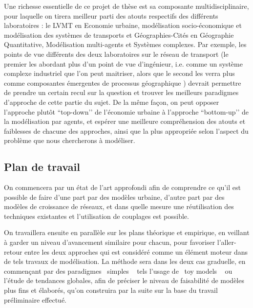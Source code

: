 \documentclass[french,12pt]{article}
\makeatletter
\providecommand{\og}{\leavevmode\flqq~}%
\providecommand{\fg}{\ifdim\lastskip>\z@\unskip\fi~\frqq}%
\makeatother
\begin{document}
Une richesse essentielle de ce projet de thèse est sa composante multidisciplinaire, pour laquelle on tirera meilleur parti des atouts respectifs des différents laboratoires : le LVMT en Economie urbaine, modélisation socio-économique et modélisation des systèmes de transports et Géographies-Cités en Géographie Quantitative, Modélisation multi-agents et Systèmes complexes. Par exemple, les points de vue différents des deux laboratoires sur le réseau de transport (le premier les abordant plus d’un point de vue d’ingénieur, i.e. comme un système complexe industriel que l’on peut maitriser, alors que le second les verra plus comme composantes émergentes de processus géographique ) devrait permettre de prendre un certain recul sur la question et trouver les meilleurs paradigmes d’approche de cette partie du sujet. De la même façon, on peut opposer l’approche plutôt ``top-down’’ de l’économie urbaine à l’approche ``bottom-up’’ de la modélisation par agents, et espérer une meilleure compréhension des atouts et faiblesses de chacune des approches, ainsi que la plus appropriée selon l’aspect du problème que nous chercherons à modéliser.


\bigskip

\subsection{Plan de travail}

On commencera par un état de l'art approfondi afin de comprendre ce qu'il est possible de faire d'une part par des modèles urbaine, d'autre part par des modèles de croissance de réseaux, et dans quelle mesure une réutilisation des techniques existantes et l'utilisation de couplages est possible.

\bigskip

On travaillera ensuite en parallèle sur les plans théorique et empirique,
en veillant à garder un niveau d'avancement similaire pour chacun,
pour favoriser l'aller-retour entre les deux approches qui est considéré
comme un élément moteur dans de tels travaux de modélisation. La méthode
sera dans les deux cas graduelle, en commençant par des paradigmes
\og simples \fg{} tels l'usage de \og toy models \fg{} ou l'étude
de tendances globales, afin de préciser le niveau de faisabilité de
modèles plus fins et élaborés, qu'on construira par la suite sur la
base du travail préliminaire effectué.

\bigskip
\end{document}
